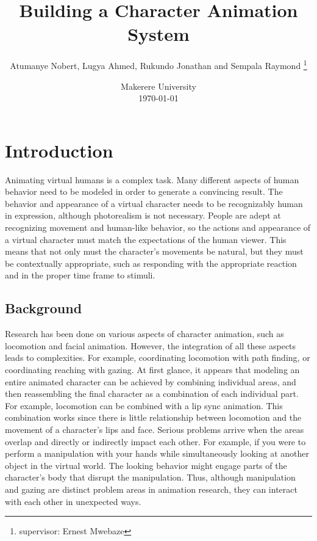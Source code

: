 \documentclass[options]{article}
\title{Building a Character Animation System}
\author{Atumanye Nobert, Lugya Ahmed, Rukundo Jonathan and Sempala Raymond \thanks{supervisor: Ernest Mwebaze}}
\date{%
    Makerere University\\%
    \today
}
\begin{document}
\begin{titlepage}
\maketitle
\end{titlepage}





\section{\textbf{ Introduction}} 
Animating virtual humans is a complex task. Many diﬀerent aspects of human behavior need to be modeled in order to generate a convincing result. The behavior and appearance of a virtual character needs to be recognizably human in expression, although photorealism is not necessary. \bigbreak People are adept at recognizing movement and human-like behavior, so the actions and appearance of a virtual character must match the expectations of the human viewer. This means that not only must the character’s movements be natural, but they must be contextually appropriate, such as responding with the appropriate reaction and in the proper time frame to stimuli. 


\subsection{\textbf{Background}}
Research has been done on various aspects of character animation, such as locomotion and facial animation. However, the integration of all these aspects leads to complexities. For example, coordinating locomotion with path ﬁnding, or coordinating reaching with gazing.\bigbreak
At first glance, it appears that modeling an entire animated character can be achieved by combining individual areas, and then reassembling the ﬁnal character as a combination of each individual part. For example, locomotion can be combined with a lip sync animation. This combination works since there is little relationship between locomotion and the movement of a character’s lips and face. Serious problems arrive when the areas overlap and directly or indirectly impact each other. For example, if you were to perform a manipulation with your hands while simultaneously looking at another object in the virtual world. The looking behavior might engage parts of the character’s body that disrupt the manipulation. Thus, although manipulation and gazing are distinct problem areas in animation research, they can interact with each other in unexpected ways.
\end{document}
